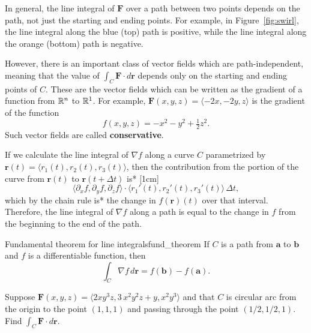 \documentclass[svgnames]{watsonbook}
\begin{document}
In general, the line integral of $\mathbf{F}$ over a path between two
points depends on the path, not just the starting and ending points.
For example, in Figure~\ref{fig:swirl}, the line integral along the
blue (top) path is positive, while the line integral along the orange
(bottom) path is negative.

However, there is an important class of vector fields which are
path-independent, meaning that the value of $\int_C \mathbf{F} \cdot
d\mathbf{r}$ depends only on the starting and ending points of $C$.
These are the vector fields which can be written as the gradient of a
function from $\mathbb{R}^n$ to $\mathbb{R}^1$. For example, $\mathbf{F}(x,y,z) =
\langle -2x, -2y, z \rangle$ is the gradient of the function
\[
  f(x,y,z) = -x^2-y^2 + \tfrac{1}{2}z^2. 
\]
Such vector fields are called \textbf{conservative}. 

If we calculate the line integral of $\nabla f$ along a curve $C$
parametrized by $\mathbf{r}(t) = \langle r_1(t), r_2(t), r_3(t) \rangle$,
then the contribution from the portion of the curve from
$\mathbf{r}(t)$ to $\mathbf{r}(t+\Delta t)$ is*
[1cm]
\[
  \langle \partial_x f, \partial_y f, \partial_z f \rangle \cdot
  \langle r_1'(t), r_2'(t), r_3'(t) \rangle \, \Delta t, 
\]
which by the chain rule is* the change in
$f(\mathbf{r})(t)$ over that interval. Therefore, the line
integral of $\nabla f$ along a path is equal to the change in $f$ from
the beginning to the end of the path.

\begin{theo}{Fundamental theorem for line integrals}{fund_theorem}
  If $C$ is a path from $\mathbf{a}$ to $\mathbf{b}$ and $f$ is a
  differentiable function, then 
  \[
    \int_C \nabla f \, d\mathbf{r} = f(\mathbf{b}) - f(\mathbf{a}). 
  \]
\end{theo}

\begin{example}{}{}
  Suppose $\mathbf{F}(x,y,z) = \langle 2  x y^{3} z, 3 \, x^{2} y^{2}
  z + y, x^{2} y^{3} \rangle$ and that $C$ is circular arc from the
  origin to the point $(1,1,1)$ and passing through the point
  $(1/2,1/2,1)$. Find $\int_C \mathbf{F} \cdot d \mathbf{r}$. 
\end{example}
\end{document}

